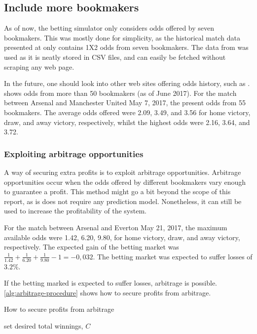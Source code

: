 \subsection{Include more bookmakers}

As of now, the betting simulator only considers odds offered by seven bookmakers. This was mostly done for simplicity, as the historical match data presented at \citet{bib:football-data} only contains 1X2 odds from seven bookmakers. The data from \citet{bib:football-data} was used as it is neatly stored in CSV files, and can easily be fetched without scraping any web page.

In the future, one should look into other web sites offering odds history, such as \citet{bib:odds-portal}. \citet{bib:odds-portal} shows odds from more than 50 bookmakers (as of June 2017). For the match between Arsenal and Manchester United May 7, 2017, the \citet{bib:odds-portal} present odds from 55 bookmakers. The average odds offered were 2.09, 3.49, and 3.56 for home victory, draw, and away victory, respectively, whilst the highest odds were 2.16, 3.64, and 3.72.


\subsubsection{Exploiting arbitrage opportunities}

A way of securing extra profits is to exploit arbitrage opportunities. Arbitrage opportunities occur when the odds offered by different bookmakers vary enough to guarantee a profit. This method might go a bit beyond the scope of this report, as is does not require any prediction model. Nonetheless, it can still be used to increase the profitability of the system.

For the match between Arsenal and Everton May 21, 2017, the maximum available odds were 1.42, 6.20, 9.80, for home victory, draw, and away victory, respectively. The expected gain of the betting market was $\frac{1}{1.42} + \frac{1}{6.20} + \frac{1}{9.80} - 1 = -0,032$. The betting market was expected to suffer losses of $3.2\%$.

If the betting marked is expected to suffer losses, arbitrage is possible. \cref{alg:arbitrage-procedure} shows how to secure profits from arbitrage.
\begin{algorithm}
    \caption{How to secure profits from arbitrage \label{alg:arbitrage-procedure}}
    set desired total winnings, $C$\;
\end{algorithm}

